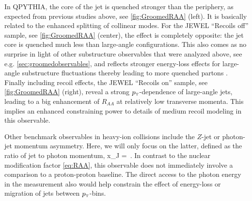 In QPYTHIA, the core of the jet is quenched stronger than the periphery, as expected from previous studies above, see \autoref{fig:GroomedRAA} (left). It is basically related to the enhanced splitting of collinear modes. For the JEWEL ``Recoils off'' sample, see \autoref{fig:GroomedRAA} (center), the effect is completely opposite: the jet core is quenched much less than large-angle configurations. This also comes as no surprise in light  of other substructure observables that were analyzed above, see e.g. \autoref{sec:groomedobservables}, and reflects stronger energy-loss effects for large-angle substructure fluctuations thereby leading to more quenched partons \cite{Milhano:2015mng}. Finally including recoil effects, the JEWEL ``Recoils on'' sample, see \autoref{fig:GroomedRAA} (right), reveal a strong $p_{\text{\tiny T}}$-dependence of large-angle jets, leading to a big enhancement of $R_{AA}$ at relatively low transverse momenta. This implies an enhanced constraining power to details of medium recoil modeling in this observable.

Other benchmark observables in heavy-ion collisions include the $Z$-jet or photon-jet momentum asymmetry. Here, we will only focus on the latter, defined as the ratio of jet to photon momentum, 
\beq
x_{J\gamma} =  \,.
\eeq
In contrast to the nuclear modification factor \eqref{eq:RAA}, this observable does not immediately involve a comparison to a proton-proton baseline. The direct access to the photon energy in the measurement also would help constrain the effect of energy-loss or migration of jets between $p_{\text{\tiny T}}$-bins.

